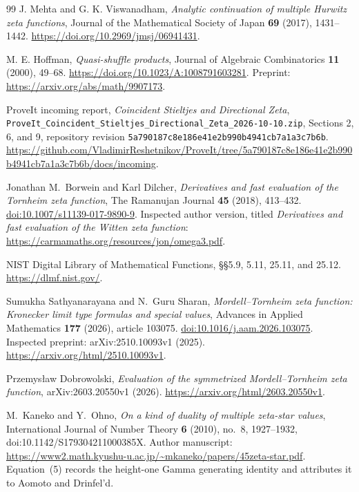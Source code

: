 \documentclass[11pt]{article}
\numberwithin{equation}{section}
\theoremstyle{plain}
\theoremstyle{definition}
\theoremstyle{remark}
\begin{document}
\begin{thebibliography}{99}
J. Mehta and G. K. Viswanadham,
\emph{Analytic continuation of multiple Hurwitz zeta functions},
Journal of the Mathematical Society of Japan \textbf{69} (2017), 1431--1442.
\url{https://doi.org/10.2969/jmsj/06941431}.

M. E. Hoffman,
\emph{Quasi-shuffle products},
Journal of Algebraic Combinatorics \textbf{11} (2000), 49--68.
\url{https://doi.org/10.1023/A:1008791603281}.
Preprint: \url{https://arxiv.org/abs/math/9907173}.



ProveIt incoming report,
\emph{Coincident Stieltjes and Directional Zeta},
\texttt{ProveIt\_Coincident\_Stieltjes\_Directional\_Zeta\_2026-10-10.zip},
Sections 2, 6, and 9,
repository revision \texttt{5a790187c8e186e41e2b990b4941cb7a1a3c7b6b}.
\url{https://github.com/VladimirReshetnikov/ProveIt/tree/5a790187c8e186e41e2b990b4941cb7a1a3c7b6b/docs/incoming}.

Jonathan M.~Borwein and Karl Dilcher,
\emph{Derivatives and fast evaluation of the Tornheim zeta function},
The Ramanujan Journal \textbf{45} (2018), 413--432.
\href{https://doi.org/10.1007/s11139-017-9890-9}{doi:10.1007/s11139-017-9890-9}.
Inspected author version, titled
\emph{Derivatives and fast evaluation of the Witten zeta function}:
\url{https://carmamaths.org/resources/jon/omega3.pdf}.

NIST Digital Library of Mathematical Functions,
\S\S5.9, 5.11, 25.11, and 25.12.
\url{https://dlmf.nist.gov/}.

Sumukha Sathyanarayana and N.~Guru Sharan,
\emph{Mordell--Tornheim zeta function: Kronecker limit type formulas
and special values}, Advances in Applied Mathematics
\textbf{177} (2026), article 103075.
\href{https://doi.org/10.1016/j.aam.2026.103075}{doi:10.1016/j.aam.2026.103075}.
Inspected preprint: arXiv:2510.10093v1 (2025).
\url{https://arxiv.org/html/2510.10093v1}.

Przemys\l aw Dobrowolski,
\emph{Evaluation of the symmetrized Mordell--Tornheim zeta function},
arXiv:2603.20550v1 (2026).
\url{https://arxiv.org/html/2603.20550v1}.



M.~Kaneko and Y.~Ohno,
\emph{On a kind of duality of multiple zeta-star values},
International Journal of Number Theory \textbf{6} (2010), no.~8,
1927--1932, doi:10.1142/S179304211000385X.
Author manuscript: \url{https://www2.math.kyushu-u.ac.jp/~mkaneko/papers/45zeta-star.pdf}.
Equation~(5) records the height-one Gamma generating identity and attributes
it to Aomoto and Drinfel'd.


\end{thebibliography}
\end{document}
